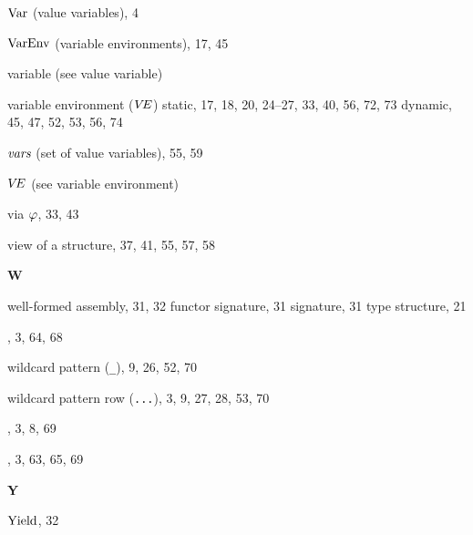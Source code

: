 \begin{theindex}
\item ${\rm Var}$ (value variables), 4
\item ${\rm VarEnv}$ (variable environments), 17, 45
\item variable (see value variable) 
\item variable environment ($\mbox{$V\!E$}$) 
\subitem static, 17, 18, 20, 24--27, 33, 40, 56, 72, 73
\subitem dynamic, 45, 47, 52, 53, 56, 74
\item $\mbox{\it vars}$ (set of value variables), 55, 59
\item $\mbox{$V\!E$}$ (see variable environment) 
\item via $\varphi$, 33, 43
\item view of a structure, 37, 41, 55, 57, 58
\indexspace
\parbox{65mm}{\hfil{\large\bf W}\hfil}
\indexspace
\item well-formed 
\subitem assembly, 31, 32
\subitem functor signature, 31
\subitem signature, 31
\subitem type structure, 21
\item \WHILE, 3, 64, 68
\item wildcard pattern (\verb+_+), 9, 26, 52, 70
\item wildcard pattern row (\verb+...+), 3, 9, 27, 28, 53, 70
\item \WITH, 3, 8, 69
\item \WITHTYPE, 3, 63, 65, 69
\indexspace
\parbox{65mm}{\hfil{\large\bf Y}\hfil}
\indexspace
\item $\mathop{\rm Yield}\nolimits$, 32
\end{theindex}
